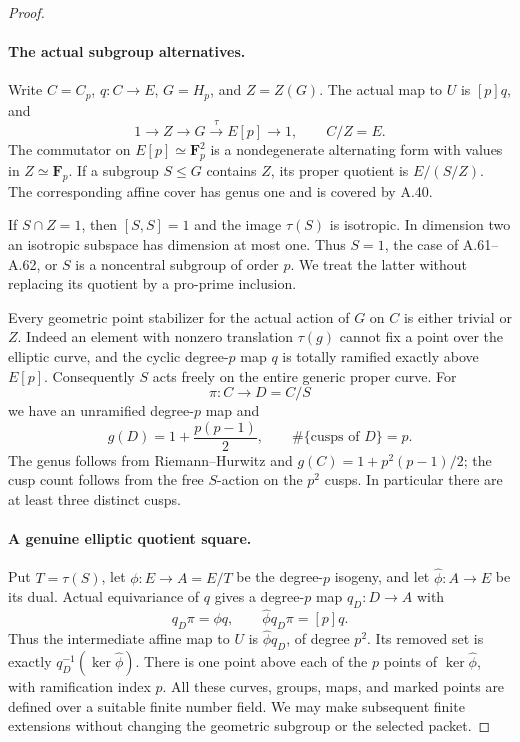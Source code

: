 \begin{proof}
\paragraph{The actual subgroup alternatives.}
Write \(C=C_p\), \(q:C\to E\),
\(G=H_p\), and \(Z=Z(G)\). The actual map
to \(U\) is \([p]q\), and
\[
  1\longrightarrow Z\longrightarrow G
       \xrightarrow{\;\tau\;} E[p]\longrightarrow1,
  \qquad C/Z=E.                                      \tag{A.65.1}
\]
The commutator on \(E[p]\simeq\mathbf F_p^2\)
is a nondegenerate alternating form with values
in \(Z\simeq\mathbf F_p\). If a subgroup
\(S\le G\) contains \(Z\), its proper quotient
is \(E/(S/Z)\). The corresponding affine cover
has genus one and is covered by A.40.

If \(S\cap Z=1\), then \([S,S]=1\) and
the image \(\tau(S)\) is isotropic. In dimension
two an isotropic subspace has dimension at most
one. Thus \(S=1\), the case of A.61--A.62, or
\(S\) is a noncentral subgroup of order \(p\).
We treat the latter without replacing its quotient
by a pro-prime inclusion.

Every geometric point stabilizer for the actual
action of \(G\) on \(C\) is either trivial or
\(Z\). Indeed an element with nonzero translation
\(\tau(g)\) cannot fix a point over the elliptic
curve, and the cyclic degree-\(p\) map \(q\)
is totally ramified exactly above \(E[p]\).
Consequently \(S\) acts freely on the entire
generic proper curve. For
\[
       \pi:C\longrightarrow D=C/S
\]
we have an unramified degree-\(p\) map and
\[
 g(D)=1+\frac{p(p-1)}2,\qquad
 \#\{\text{cusps of }D\}=p.                         \tag{A.65.2}
\]
The genus follows from Riemann--Hurwitz and
\(g(C)=1+p^2(p-1)/2\); the cusp count follows
from the free \(S\)-action on the \(p^2\)
cusps. In particular there are at least three
distinct cusps.

\paragraph{A genuine elliptic quotient square.}
Put \(T=\tau(S)\), let
\(\phi:E\to A=E/T\) be the degree-\(p\)
isogeny, and let \(\widehat\phi:A\to E\)
be its dual. Actual equivariance of \(q\)
gives a degree-\(p\) map \(q_D:D\to A\)
with
\[
       q_D\pi=\phi q,\qquad
       \widehat\phi q_D\pi=[p]q.                    \tag{A.65.3}
\]
Thus the intermediate affine map to \(U\) is
\(\widehat\phi q_D\), of degree \(p^2\).
Its removed set is exactly
\(q_D^{-1}(\ker\widehat\phi)\). There is one
point above each of the \(p\) points of
\(\ker\widehat\phi\), with ramification
index \(p\). All these curves, groups, maps,
and marked points are defined over a suitable
finite number field. We may make subsequent
finite extensions without changing the geometric
subgroup or the selected packet.


\end{proof}
